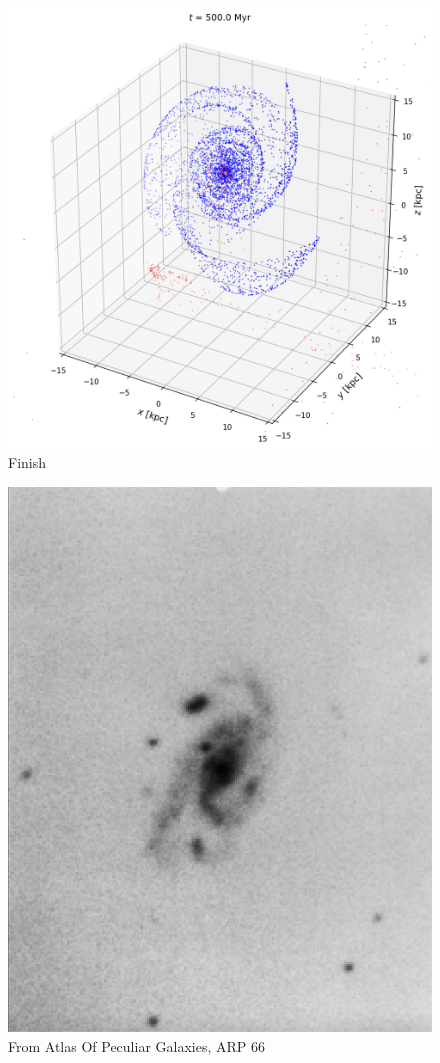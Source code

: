 \documentclass[linenumbers,RNAAS,trackchanges]{aastex631}
\begin{document}
\begin{figure}[H]
    \centering
    \includegraphics[scale=.40]{comparison_galaxy/ARP_66_output.png}
    \caption{Finish}
    \label{fig:code}
\end{figure}
\begin{figure}[H]
    \centering
    \includegraphics[scale=.50]{comparison_galaxy/arp_66.png}
    \caption{From Atlas Of Peculiar Galaxies, ARP 66}
    \label{fig:code}
\end{figure}
\end{document}

